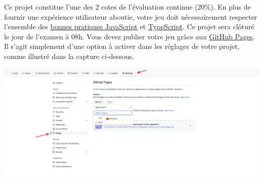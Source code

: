 \documentclass[11pt, a4paper]{article}
\begin{document}
Ce projet constitue l'une des 2 cotes de l'évaluation continue (20\%). En plus de fournir une expérience utilisateur aboutie, votre jeu doit nécessairement respecter l'ensemble des \href{https://github.com/hepl-dcc/dcc-guidelines}{bonnes pratiques JavaScript} et \href{https://github.com/hepl-mmi/mmi-guidelines}{TypeScript}.
Ce projet sera clôturé le jour de l'examen à 08h. Vous devez publier votre jeu grâce aux \href{https://docs.github.com/en/pages/getting-started-with-github-pages/configuring-a-publishing-source-for-your-github-pages-site}{GitHub Pages}. Il s'agit simplement d'une option à activer dans les réglages de votre projet, comme illustré dans la capture ci-dessous.

\vspace*{1cm}

\includegraphics[width=\textwidth]{img/pages.jpg}
\end{document}
